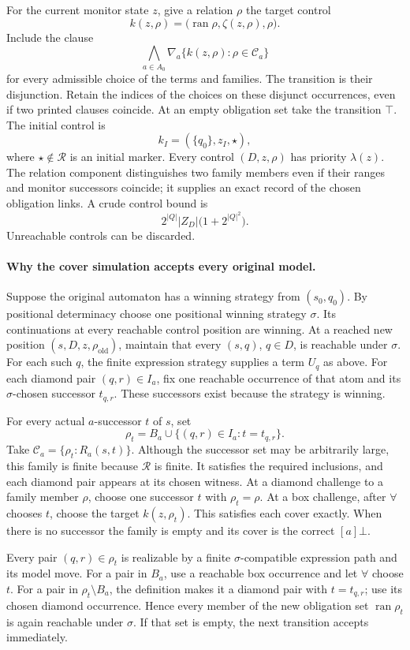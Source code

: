 For the current monitor state \(z\),
give a relation \(\rho\) the
target control
\[
 k(z,\rho)=
       \bigl(\operatorname{ran}\rho,\zeta(z,\rho),\rho\bigr).
\]
Include the clause
\[
 \bigwedge_{a\in A_0}
       \nabla_a\{k(z,\rho):\rho\in\mathcal C_a\}
\]
for every admissible choice of
the terms and families.
The transition is their disjunction.
Retain the indices of the choices
on these disjunct occurrences,
even if two printed clauses coincide.
At an empty obligation set take
the transition \(\top\).
The initial control is
\[
 k_I=(\{q_0\},z_I,\star),
\]
where \(\star\notin\mathcal R\)
is an initial marker. Every
control \((D,z,\rho)\) has priority
\(\lambda(z)\).
The relation component distinguishes
two family members even if their
ranges and monitor successors
coincide; it supplies an exact
record of the chosen obligation
links. A crude control bound is
\[
 2^{|Q|}|Z_D|\bigl(1+2^{|Q|^2}\bigr).
\]
Unreachable controls can be discarded.

\paragraph{Why the cover simulation accepts every original model.}
Suppose the original automaton has
a winning strategy from \((s_0,q_0)\).
By positional determinacy choose
one positional winning strategy
\(\sigma\). Its continuations
at every reachable control
position are winning.
At a reached new position
\((s,D,z,\rho_{\mathrm{old}})\),
maintain that every \((s,q)\),
\(q\in D\), is reachable under
\(\sigma\).
For each such \(q\), the finite
expression strategy supplies a
term \(U_q\) as above.
For each diamond pair
\((q,r)\in I_a\), fix one
reachable occurrence of that
atom and its \(\sigma\)-chosen
successor \(t_{q,r}\).
These successors exist because
the strategy is winning.

For every actual \(a\)-successor
\(t\) of \(s\), set
\[
 \rho_t=B_a\cup
       \{(q,r)\in I_a:t=t_{q,r}\}.
\]
Take
\(\mathcal C_a=\{\rho_t:R_a(s,t)\}\).
Although the successor set may
be arbitrarily large, this family
is finite because \(\mathcal R\)
is finite. It satisfies the
required inclusions, and each
diamond pair appears at its
chosen witness.
At a diamond challenge to a
family member \(\rho\), choose
one successor \(t\) with
\(\rho_t=\rho\).
At a box challenge, after
\(\forall\) chooses \(t\),
choose the target \(k(z,\rho_t)\).
This satisfies each cover exactly.
When there is no successor the
family is empty and its cover
is the correct \([a]\bot\).

Every pair \((q,r)\in\rho_t\)
is realizable by a finite
\(\sigma\)-compatible expression
path and its model move.
For a pair in \(B_a\), use
a reachable box occurrence
and let \(\forall\) choose \(t\).
For a pair in \(\rho_t\setminus B_a\),
the definition makes it a
diamond pair with \(t=t_{q,r}\);
use its chosen diamond occurrence.
Hence every member of the new
obligation set
\(\operatorname{ran}\rho_t\)
is again reachable under
\(\sigma\). If that set is
empty, the next transition
accepts immediately.

